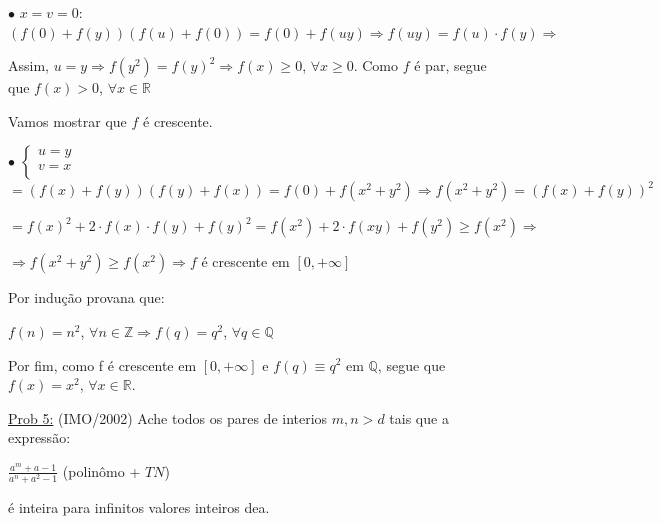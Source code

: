 \documentclass[a4paper,12pt]{article}
\renewcommand{\geq}{\ensuremath{\geqslant}}
\theoremstyle{plain} %
\theoremstyle{definition} %
\theoremstyle{remark} %
\begin{document}
\begin{framed}
		$\bullet$\hspace{1em} $x=v=0:$ $(f(0)+f(y))(f(u)+f(0))=f(0)+f(uy)\Rightarrow f(uy)=f(u)\cdot f(y)\Rightarrow$ 
		
		Assim, $u=y\Rightarrow f(y^2)=f(y)^2\Rightarrow f(x)\geq 0$, $\forall x\geq 0$. Como $f$ \'e par, segue que $f(x)>0$, $\forall x\in\mathds{R}$
		
		Vamos mostrar que $f$ \'e crescente.
		
		$\bullet$\hspace{1em} $\left\{
		\begin{array}{lc}
			u=y\\
			v=x\\
		\end{array}
		\right.$ $=(f(x)+f(y))(f(y)+f(x))=f(0)+f(x^2+y^2)\Rightarrow f(x^2+y^2)=(f(x)+f(y))^2$
		
		$=f(x)^2+2\cdot f(x)\cdot f(y)+f(y)^2=f(x^2)+2\cdot f(xy)+f(y^2)\geq f(x^2)\Rightarrow$
		
		$\Rightarrow f(x^2+y^2)\geq f(x^2) \Rightarrow f$ \'e crescente em $[0, +\infty]$
		
		Por indu\c{c}\~ao provana que:
		
		$f(n)=n^2$, $\forall n\in\mathds{Z} \Rightarrow f(q)=q^2$, $\forall q\in\mathds{Q}$
		
		Por fim, como f \'e crescente em $[0, +\infty]$ e $f(q)\equiv q^2$ em $\mathds{Q}$, segue que $f(x)=x^2$, $\forall x\in \mathds{R}$.
	\end{framed}
	
	\vspace{2ex}\underline{Prob 5:} (IMO/2002) Ache todos os pares de interios $m, n>d$ tais que a express\~ao:
	
	\begin{center}
		$\displaystyle\frac{a^m+a-1}{a^n+a^2-1}$ (polin\^omo + $TN$)
	\end{center} 
	
	\'e inteira para infinitos valores inteiros dea.
	
\end{document}
